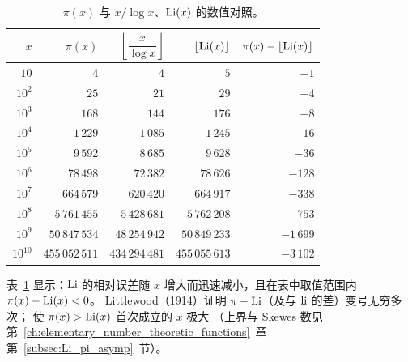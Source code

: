 \begin{table}[htbp]
\centering
\caption{$\pi(x)$ 与 $x/\log x$、$\operatorname{Li}(x)$ 的数值对照。}
\label{tab:pix}
\renewcommand{\arraystretch}{1.3}
\begin{tabular}{r r r r r}
\toprule
$x$ & $\pi(x)$ & $\left\lfloor\dfrac{x}{\log x}\right\rfloor$ & $\left\lfloor\operatorname{Li}(x)\right\rfloor$ & $\pi(x) - \left\lfloor\operatorname{Li}(x)\right\rfloor$ \\[6pt]
\midrule
$10$ & $4$ & $4$ & $5$ & $-1$ \\
$10^2$ & $25$ & $21$ & $29$ & $-4$ \\
$10^3$ & $168$ & $144$ & $176$ & $-8$ \\
$10^4$ & $1\,229$ & $1\,085$ & $1\,245$ & $-16$ \\
$10^5$ & $9\,592$ & $8\,685$ & $9\,628$ & $-36$ \\
$10^6$ & $78\,498$ & $72\,382$ & $78\,626$ & $-128$ \\
$10^7$ & $664\,579$ & $620\,420$ & $664\,917$ & $-338$ \\
$10^8$ & $5\,761\,455$ & $5\,428\,681$ & $5\,762\,208$ & $-753$ \\
$10^9$ & $50\,847\,534$ & $48\,254\,942$ & $50\,849\,233$ & $-1\,699$ \\
$10^{10}$ & $455\,052\,511$ & $434\,294\,481$ & $455\,055\,613$ & $-3\,102$ \\
\bottomrule
\end{tabular}
\end{table}

表~\ref{tab:pix} 显示：$\operatorname{Li}$ 的相对误差随 $x$ 增大而迅速减小，且在表中取值范围内 $\pi(x)-\operatorname{Li}(x)<0$。
Littlewood（1914）证明 $\pi-\operatorname{Li}$（及与 $\operatorname{li}$ 的差）变号无穷多次；
使 $\pi(x)>\operatorname{Li}(x)$ 首次成立的 $x$ 极大
（上界与 Skewes 数见第~\ref{ch:elementary_number_theoretic_functions}~章第~\ref{subsec:Li_pi_asymp}~节）。

